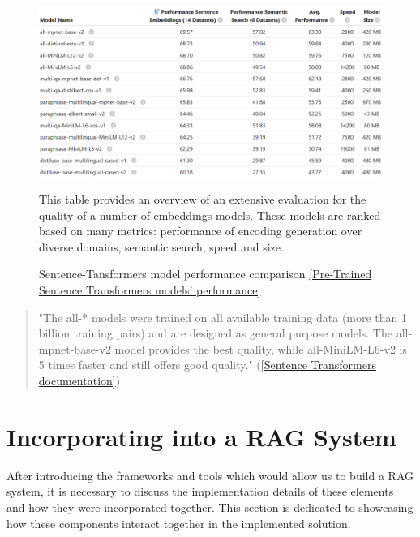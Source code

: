 \begin{figure}[H]
    \centering
    \includegraphics[width=\linewidth]{./figures/embedding-modes-performance.png}
    \caption{Sentence-Tansformers model performance comparison \href{https://sbert.net/docs/sentence_transformer/pretrained_models.html}{[Pre-Trained Sentence Transformers models' performance]}}
    \begin{flushleft}
        This table provides an overview of an extensive evaluation for the quality of a number of embeddings models. These models are ranked based on many metrics: performance of encoding generation over diverse domains, semantic search, speed and size.
    \end{flushleft}
\end{figure}
\begin{quote}
    "The all-* models were trained on all available training data (more than 1 billion training pairs) and are designed as general purpose models. The all-mpnet-base-v2 model provides the best quality, while all-MiniLM-L6-v2 is 5 times faster and still offers good quality."  (\href{https://sbert.net/docs/sentence_transformer/pretrained_models.html}{[Sentence Transformers documentation]})
\end{quote}

\section{Incorporating into a RAG System}
After introducing the frameworks and tools which would allow us to build a RAG system, it is necessary to discuss the implementation details of these elements and how they were incorporated together.\newline
This section is dedicated to showcasing how these components interact together in the implemented solution.

